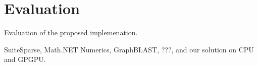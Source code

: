 \section{Evaluation}

Evaluation of the proposed implemenation.

SuiteSparse, Math.NET Numerics, GraphBLAST, ???, and our solution on CPU and GPGPU.